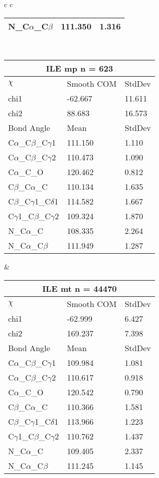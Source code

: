 \begin{longtable}{ c c }
\begin{tabular}{ l l l }
  N\_C$\alpha$\_C$\beta$ & 111.350 & 1.316\\
  \bottomrule
  \end{tabular}
  \\
  \begin{tabular}{ l l l }
  \toprule
  \multicolumn{3}{c}{ILE \textbf{mp} n = 623} \\ \toprule
  $\chi$       & Smooth COM & StdDev \\ \midrule
  chi1 & -62.667 & 11.611 \\ 
  chi2 & 88.683 & 16.573 \\ \midrule
  Bond Angle   & Mean     & StdDev \\ \midrule
  C$\alpha$\_C$\beta$\_C$\gamma$1 & 111.150 & 1.110\\
  C$\alpha$\_C$\beta$\_C$\gamma$2 & 110.473 & 1.090\\
  C$\alpha$\_C\_O & 120.462 & 0.812\\
  C$\beta$\_C$\alpha$\_C & 110.134 & 1.635\\
  C$\beta$\_C$\gamma$1\_C$\delta$1 & 114.582 & 1.667\\
  C$\gamma$1\_C$\beta$\_C$\gamma$2 & 109.324 & 1.870\\
  N\_C$\alpha$\_C & 108.335 & 2.264\\
  N\_C$\alpha$\_C$\beta$ & 111.949 & 1.287\\
  \bottomrule
  \end{tabular}
  &
  \begin{tabular}{ l l l }
  \toprule
  \multicolumn{3}{c}{ILE \textbf{mt} n = 44470} \\ \toprule
  $\chi$       & Smooth COM & StdDev \\ \midrule
  chi1 & -62.999 & 6.427 \\ 
  chi2 & 169.237 & 7.398 \\ \midrule
  Bond Angle   & Mean     & StdDev \\ \midrule
  C$\alpha$\_C$\beta$\_C$\gamma$1 & 109.984 & 1.081\\
  C$\alpha$\_C$\beta$\_C$\gamma$2 & 110.617 & 0.918\\
  C$\alpha$\_C\_O & 120.542 & 0.790\\
  C$\beta$\_C$\alpha$\_C & 110.366 & 1.581\\
  C$\beta$\_C$\gamma$1\_C$\delta$1 & 113.966 & 1.223\\
  C$\gamma$1\_C$\beta$\_C$\gamma$2 & 110.762 & 1.437\\
  N\_C$\alpha$\_C & 109.405 & 2.337\\
  N\_C$\alpha$\_C$\beta$ & 111.245 & 1.145\\

\end{tabular}
\end{longtable}
